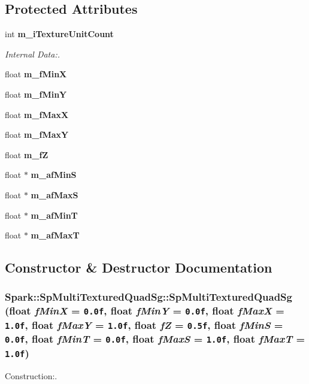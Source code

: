 \subsection*{Protected Attributes}
\begin{CompactItemize}
\item 
int {\bf m\_\-i\-Texture\-Unit\-Count}
\begin{CompactList}\small\item\em Internal Data:. \item\end{CompactList}\item 
float {\bf m\_\-f\-Min\-X}
\item 
float {\bf m\_\-f\-Min\-Y}
\item 
float {\bf m\_\-f\-Max\-X}
\item 
float {\bf m\_\-f\-Max\-Y}
\item 
float {\bf m\_\-f\-Z}
\item 
float $\ast$ {\bf m\_\-af\-Min\-S}
\item 
float $\ast$ {\bf m\_\-af\-Max\-S}
\item 
float $\ast$ {\bf m\_\-af\-Min\-T}
\item 
float $\ast$ {\bf m\_\-af\-Max\-T}
\end{CompactItemize}


\subsection{Constructor \& Destructor Documentation}
\subsubsection{\setlength{\rightskip}{0pt plus 5cm}Spark::Sp\-Multi\-Textured\-Quad\-Sg::Sp\-Multi\-Textured\-Quad\-Sg (float {\em f\-Min\-X} = {\tt 0.0f}, float {\em f\-Min\-Y} = {\tt 0.0f}, float {\em f\-Max\-X} = {\tt 1.0f}, float {\em f\-Max\-Y} = {\tt 1.0f}, float {\em f\-Z} = {\tt 0.5f}, float {\em f\-Min\-S} = {\tt 0.0f}, float {\em f\-Min\-T} = {\tt 0.0f}, float {\em f\-Max\-S} = {\tt 1.0f}, float {\em f\-Max\-T} = {\tt 1.0f})\hspace{0.3cm}{\tt  [inline]}}\label{classSpark_1_1SpMultiTexturedQuadSg_a0}


Construction:. 

